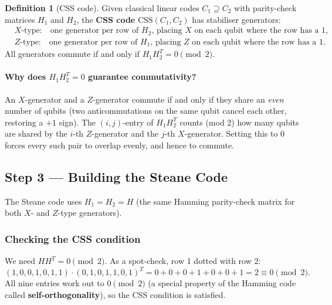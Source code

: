 \documentclass[11pt, a4paper]{article}
\theoremstyle{definition}
\newtheorem{definition}{Definition}[section]
\theoremstyle{plain}
\theoremstyle{remark}
\begin{document}
\begin{definition}[CSS code]
Given classical linear codes $C_1 \supseteq C_2$ with parity-check
matrices $H_1$ and $H_2$, the \textbf{CSS code}
$\mathrm{CSS}(C_1, C_2)$ has stabiliser generators:
\begin{align*}
  &\text{$X$-type:} \quad
    \text{one generator per row of } H_2\text{, placing }X
    \text{ on each qubit where the row has a 1,}\\
  &\text{$Z$-type:} \quad
    \text{one generator per row of } H_1\text{, placing }Z
    \text{ on each qubit where the row has a 1.}
\end{align*}
All generators commute if and only if $H_1 H_2^T = 0 \pmod{2}$.
\end{definition}

\paragraph{Why does $H_1 H_2^T = 0$ guarantee commutativity?}
An $X$-generator and a $Z$-generator commute if and only if they
share an \emph{even} number of qubits (two anticommutations on the
same qubit cancel each other, restoring a $+1$ sign).  The
$(i,j)$-entry of $H_1 H_2^T$ counts (mod 2) how many qubits are
shared by the $i$-th $Z$-generator and the $j$-th $X$-generator.
Setting this to 0 forces every such pair to overlap evenly, and
hence to commute.

\subsection{Step 3 --- Building the Steane Code}

The Steane code uses $H_1 = H_2 = H$ (the same Hamming parity-check
matrix for both $X$- and $Z$-type generators).

\subsubsection{Checking the CSS condition}

We need $HH^T = 0 \pmod{2}$.  As a spot-check, row 1 dotted with
row 2:
\[
  (1,0,0,1,0,1,1)\cdot(0,1,0,1,1,0,1)^T
  = 0+0+0+1+0+0+1 = 2 \equiv 0 \pmod{2}.
\]
All nine entries work out to $0 \pmod{2}$ (a special property of the
Hamming code called \textbf{self-orthogonality}), so the CSS
condition is satisfied.
\end{document}
